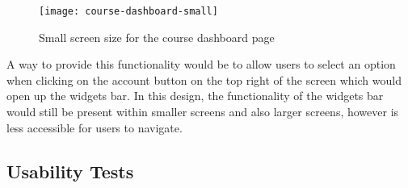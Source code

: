 \begin{figure}[h!]
    \centering
    \texttt{[image: course-dashboard-small]}
    \caption{Small screen size for the course dashboard page}
\end{figure}

A way to provide this functionality would be to allow users to select an option when clicking on the account button on the top right of the screen which would open up the widgets bar.
In this design, the functionality of the widgets bar would still be present within smaller screens and also larger screens, however is less accessible for users to navigate.

\subsection{Usability Tests}
